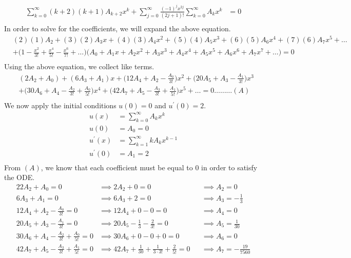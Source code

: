 \documentclass[a4paper]{article}
\newcommand{\ds}{\displaystyle}
\begin{document}
\begin{enumerate}
\begin{align*}
		\sum^{\infty}_{k=0}(k+2)(k+1)A_{k+2}x^{k} + \sum^{\infty}_{j=0}\frac{(-1)^jx^{2j}}{(2j+1)!}\sum^{\infty}_{k=0}A_kx^k & = 0\\
	\end{align*}
	In order to solve for the coefficients, we will expand the above equation.
	\begin{align*}
		& (2)(1)A_2 + (3)(2)A_3x + (4)(3)A_4x^2 + (5)(4)A_5x^3 + (6)(5)A_6x^4 + (7)(6)A_7x^5 + \dots\\
		& + \Big(1 - \frac{x^2}{3!} + \frac{x^4}{5!} - \frac{x^6}{7!} + \dots \Big)\Big(A_0 + A_1x + A_2x^2 + A_3x^3 + A_4x^4 + A_5x^5 + A_6x^6 + A_7x^7 + \dots \Big) = 0\\
	\end{align*}
	Using the above equation, we collect like terms.
	\begin{align*}
		& (2A_2 + A_0) + (6A_3 + A_1)x + \Big(12A_4 + A_2 - \frac{A_0}{3!}\Big)x^2 + \Big(20A_5 + A_3 - \frac{A_1}{3!} \Big)x^3\\ 
		& + \Big(30A_6 + A_4 - \frac{A_2}{3!} + \frac{A_0}{5!} \Big)x^4 +  \Big(42A_7 + A_5 - \frac{A_3}{3!} + \frac{A_1}{5!} \Big)x^5 + \dots = 0 \dots\dots\dots (A)\\
	\end{align*}
	We now apply the initial conditions $\ds{u(0) = 0}$ and $\ds{u^{\prime}(0) = 2}$.
	\begin{align*}
		u(x) & = \sum^{\infty}_{k=0}A_kx^k \\
		u(0) & = A_0 = 0\\
		u^{\prime}(x) & = \sum^{\infty}_{k=1}kA_kx^{k-1} \\
		u^{\prime}(0) & = A_1 = 2\\
	\end{align*}
	From $\ds{(A)}$, we know that each coefficient must be equal to 0 in order to satisfy the ODE.
	\begin{alignat*}{2}
		2A_2 + A_0 = 0 & \implies 2A_2 + 0 = 0 && \implies A_2 = 0\\
		6A_3 + A_1 = 0 & \implies 6A_3 + 2 = 0 && \implies A_3 = -\frac{1}{3}\\
		12A_4 + A_2 - \frac{A_0}{3!} = 0 & \implies 12A_4 + 0 - 0 = 0 && \implies A_4 = 0\\
		20A_5 + A_3 - \frac{A_1}{3!} = 0 & \implies 20A_5 -\frac{1}{3} - \frac{2}{3!} = 0 && \implies A_5 = \frac{1}{30}\\
		30A_6 + A_4 - \frac{A_2}{3!} + \frac{A_0}{5!} = 0 & \implies 30A_6 + 0 - 0 + 0 = 0 && \implies A_6 = 0\\
		42A_7 + A_5 - \frac{A_3}{3!} + \frac{A_1}{5!} = 0 & \implies 42A_7 + \frac{1}{30} + \frac{1}{3\cdot3!} + \frac{2}{5!} = 0 && \implies A_7 = -\frac{19}{7560}\\

\end{alignat*}
\end{enumerate}
\end{document}
